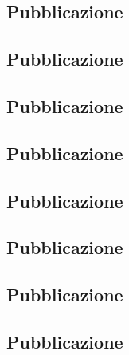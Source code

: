 \documentclass{article}
\begin{document}
\center \subsection{Pubblicazione}
\newpage


\center \subsection{Pubblicazione}
\newpage


\center \subsection{Pubblicazione}
\newpage


\center \subsection{Pubblicazione}
\newpage


\center \subsection{Pubblicazione}
\newpage


\center \subsection{Pubblicazione}
\newpage


\center \subsection{Pubblicazione}
\newpage


\center \subsection{Pubblicazione}
\newpage


 \fi






\end{document}
